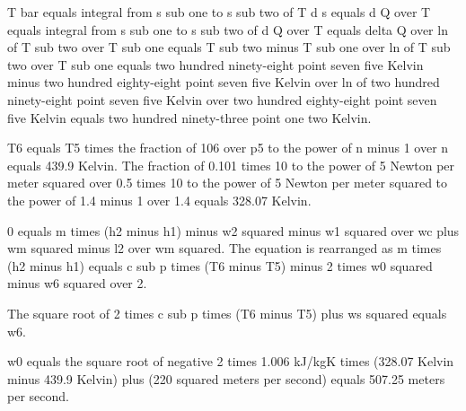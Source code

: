 T bar equals integral from s sub one to s sub two of T d s equals d Q over T equals integral from s sub one to s sub two of d Q over T equals delta Q over ln of T sub two over T sub one equals T sub two minus T sub one over ln of T sub two over T sub one equals two hundred ninety-eight point seven five Kelvin minus two hundred eighty-eight point seven five Kelvin over ln of two hundred ninety-eight point seven five Kelvin over two hundred eighty-eight point seven five Kelvin equals two hundred ninety-three point one two Kelvin.

T6 equals T5 times the fraction of 106 over p5 to the power of n minus 1 over n equals 439.9 Kelvin. The fraction of 0.101 times 10 to the power of 5 Newton per meter squared over 0.5 times 10 to the power of 5 Newton per meter squared to the power of 1.4 minus 1 over 1.4 equals 328.07 Kelvin.

0 equals m times (h2 minus h1) minus w2 squared minus w1 squared over wc plus wm squared minus l2 over wm squared. The equation is rearranged as m times (h2 minus h1) equals c sub p times (T6 minus T5) minus 2 times w0 squared minus w6 squared over 2.

The square root of 2 times c sub p times (T6 minus T5) plus ws squared equals w6.

w0 equals the square root of negative 2 times 1.006 kJ/kgK times (328.07 Kelvin minus 439.9 Kelvin) plus (220 squared meters per second) equals 507.25 meters per second.